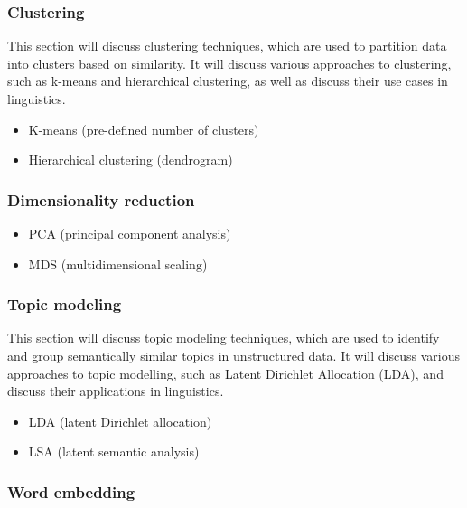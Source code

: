 \documentclass[
  letterpaper,
]{scrbook}
\providecommand{\tightlist}{%
  \setlength{\itemsep}{0pt}\setlength{\parskip}{0pt}}\usepackage{longtable,booktabs,array}
\begin{document}
\hypertarget{eda-clustering}{%
\subsubsection{Clustering}\label{eda-clustering}}

This section will discuss clustering techniques, which are used to
partition data into clusters based on similarity. It will discuss
various approaches to clustering, such as k-means and hierarchical
clustering, as well as discuss their use cases in linguistics.

\begin{itemize}
\tightlist
\item
  K-means (pre-defined number of clusters)
\item
  Hierarchical clustering (dendrogram)
\end{itemize}

\hypertarget{eda-dimensionality-reduction}{%
\subsubsection{Dimensionality
reduction}\label{eda-dimensionality-reduction}}

\begin{itemize}
\tightlist
\item
  PCA (principal component analysis)
\item
  MDS (multidimensional scaling)
\end{itemize}

\hypertarget{eda-topic-modeling}{%
\subsubsection{Topic modeling}\label{eda-topic-modeling}}

This section will discuss topic modeling techniques, which are used to
identify and group semantically similar topics in unstructured data. It
will discuss various approaches to topic modelling, such as Latent
Dirichlet Allocation (LDA), and discuss their applications in
linguistics.

\begin{itemize}
\tightlist
\item
  LDA (latent Dirichlet allocation)
\item
  LSA (latent semantic analysis)
\end{itemize}

\hypertarget{eda-word-embedding}{%
\subsubsection{Word embedding}\label{eda-word-embedding}}
\end{document}
